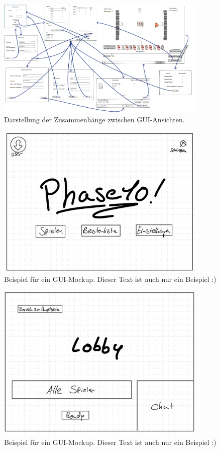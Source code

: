 \begin{figure}
	\centering
	\includegraphics[width=0.9\textwidth]{img/gui-zusammenhang}
	\caption{Darstellung der Zusammenhänge zwischen GUI-Ansichten.}
	\label{gui:zusammenhang}
\end{figure}

\begin{figure}
	\centering
	\includegraphics[width=0.9\textwidth]{img/hauptseite.jpeg}
	\caption{Beispiel für ein GUI-Mockup. Dieser Text ist auch nur ein Beispiel :)}
	\label{gui:hauptseite}
\end{figure}

\begin{figure}
	\centering
	\includegraphics[width=0.9\textwidth]{img/lobby}
	\caption{Beispiel für ein GUI-Mockup. Dieser Text ist auch nur ein Beispiel :)}
	\label{gui:lobby}
\end{figure}

